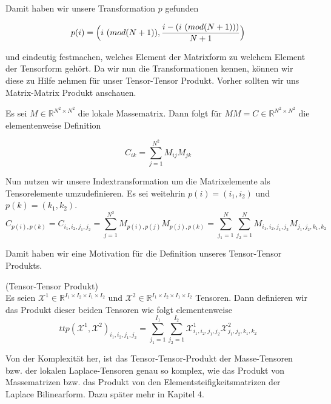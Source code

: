 Damit haben wir unsere Transformation $p$ gefunden

\begin{equation} \label{eq:p}
p(i)= \Big{(} i \, \, (mod (N+1)),  \dfrac{ i -  (i \, \, (mod (N+1))) } {N+1} \Big{)}
\end{equation}

und eindeutig festmachen, welches Element der Matrixform zu welchem Element der Tensorform gehört.
Da wir nun die Transformationen kennen, können wir diese zu Hilfe nehmen für unser Tensor-Tensor Produkt. Vorher sollten wir uns Matrix-Matrix Produkt anschauen.

Es sei $M \in \mathbb{R}^{N^2 \times N^2}$ die lokale Massematrix. Dann folgt für $MM=C \in \mathbb{R}^{N^2 \times N^2}$ die elementenweise Definition

\begin{equation}
C_{ik}=\sum_{j=1}^{N^2} M_{ij} M_{jk}
\end{equation}

Nun nutzen wir unsere Indextransformation um die Matrixelemente als Tensorelemente umzudefinieren. Es sei weitehrin $p(i)=(i_1,i_2)$ und $p(k)=(k_1,k_2)$.
\begin{equation}
C_{p(i),p(k)} = C_{i_1,i_2,j_1,j_2} =  \sum_{j=1}^{N^2} M_{p(i),p(j)} M_{p(j),p(k)} = \sum_{j_1=1}^N \sum_{j_2=1}^N M_{i_1,i_2,j_1,j_2} M_{j_1,j_2,k_1,k_2} 
\end{equation}

Damit haben wir eine Motivation für die Definition unseres Tensor-Tensor Produkts.
\begin{Definition} (Tensor-Tensor Produkt) \\
Es seien $\pmb{\mathscr{X}}^1  \in \mathbb{R}^{I_1 \times I_2 \times I_1 \times I_2}$ und $\pmb{\mathscr{X}}^2 \in \mathbb{R}^{I_1 \times I_2 \times I_1 \times I_2}$ Tensoren.
Dann definieren wir das Produkt dieser beiden Tensoren wie folgt elementenweise
\begin{equation}
ttp(\pmb{\mathscr{X}}^1,\pmb{\mathscr{X}}^2)_{i_1,i_2,j_1,j_2}= \sum_{j_1=1}^{I_1} \sum_{j_2=1}^{I_2} \pmb{\mathscr{X}}^1_{i_1,i_2,j_1,j_2} \pmb{\mathscr{X}}^2_{j_1,j_2,k_1,k_2} 
\end{equation}
\end{Definition}

Von der Komplexität her, ist das Tensor-Tensor-Produkt der Masse-Tensoren bzw. der lokalen Laplace-Tensoren genau so komplex, wie das Produkt von Massematrizen bzw. das Produkt von den Elementsteifigkeitsmatrizen der Laplace Bilinearform. Dazu später mehr in Kapitel 4.

